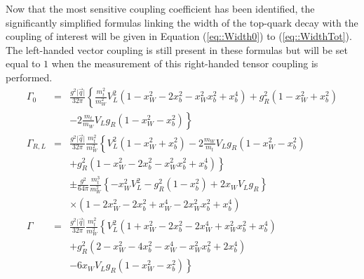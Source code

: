 Now that the most sensitive coupling coefficient has been identified, the significantly simplified formulas linking the width of the top-quark decay with the coupling of interest will be given in Equation (\ref{eq::Width0}) to (\ref{eq::WidthTot}). The left-handed vector coupling is still present in these formulas but will be set equal to $1$ when the measurement of this right-handed tensor coupling is performed.
\begin{eqnarray}
  \Gamma_{0}   & = & \frac{g^{2} \vert \vec{q} \vert}{32 \pi} \left\lbrace \frac{m_{t}^{2}}{m_{W}^{2}} V_{L}^{2} (1 - x_{W}^{2} - 2x_{b}^{2} -x_{W}^{2} x_{b}^{2} + x_{b}^{4}) + g_{R}^{2} (1 - x_{W}^{2} + x_{b}^{2}) \right. \nonumber \\
               &   & \left. - 2 \frac{m_{t}}{m_{W}} V_{L}g_{R} (1- x_{W}^{2} - x_{b}^{2}) \right\rbrace  \label{eq::Width0}\\
  \Gamma_{R,L} & = & \frac{g^{2} \vert \vec{q} \vert}{32 \pi} \frac{m_{t}^{2}}{m_{W}^{2}} \left\lbrace V_{L}^{2} (1 - x_{W}^{2} + x_{b}^{2}) - 2 \frac{m_W}{m_t} V_{L}g_{R} (1- x_{W}^{2} - x_{b}^{2}) \right. \nonumber \\
               &   & \left. + g_{R}^{2} (1 - x_{W}^{2} - 2x_{b}^{2} -x_{W}^{2} x_{b}^{2} + x_{b}^{4}) \right\rbrace \nonumber \\
               &   & \pm \frac{g^{2}}{64 \pi} \frac{m_{t}^{3}}{m_{W}^{2}} \left\lbrace -x_{W}^{2} V_{L}^{2} - g_{R}^{2} (1-x_{b}^{2}) + 2 x_{W} V_{L}g_{R} \right\rbrace \nonumber \\
               &   & \times (1-2x_{W}^{2} - 2x_{b}^{2} + x_{W}^{4} - 2x_{W}^{2} x_{b}^{2} + x_{b}^{4}) \label{eq::WidthRL} \\
  \Gamma       & = & \frac{g^{2} \vert \vec{q} \vert}{32 \pi} \frac{m_{t}^{2}}{m_{W}^{2}} \left\lbrace V_{L}^{2} (1 + x_{W}^{2} - 2x_{b}^{2} - 2 x_{W}^{4} + x_{W}^{2} x_{b}^{2} + x_{b}^{4}) \right. \nonumber \\
               &   & + g_{R}^{2} \left( 2 - x_{W}^{2} - 4 x_{b}^{2} - x_{W}^{4} - x_{W}^{2} x_{b}^{2} + 2 x_{b}^{4} \right) \nonumber \\
               &   & \left. - 6 x_{W} V_{L}g_{R} (1 - x_{W}^{2} - x_{b}^{2}) \right\rbrace \label{eq::WidthTot}
\end{eqnarray}
